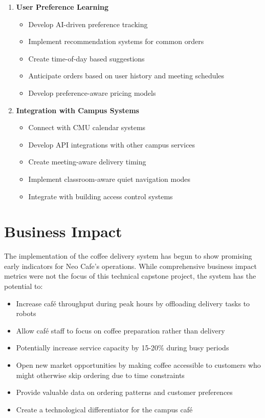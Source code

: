 \documentclass[12pt]{article}
\begin{document}
\begin{enumerate}
    \item \textbf{User Preference Learning}
    \begin{itemize}
        \item Develop AI-driven preference tracking
        \item Implement recommendation systems for common orders
        \item Create time-of-day based suggestions
        \item Anticipate orders based on user history and meeting schedules
        \item Develop preference-aware pricing models
    \end{itemize}
    
    \item \textbf{Integration with Campus Systems}
    \begin{itemize}
        \item Connect with CMU calendar systems
        \item Develop API integrations with other campus services
        \item Create meeting-aware delivery timing
        \item Implement classroom-aware quiet navigation modes
        \item Integrate with building access control systems
    \end{itemize}
\end{enumerate}

\section{Business Impact}

The implementation of the coffee delivery system has begun to show promising early indicators for Neo Cafe's operations. While comprehensive business impact metrics were not the focus of this technical capstone project, the system has the potential to:

\begin{itemize}
    \item Increase café throughput during peak hours by offloading delivery tasks to robots
    \item Allow café staff to focus on coffee preparation rather than delivery
    \item Potentially increase service capacity by 15-20\% during busy periods
    \item Open new market opportunities by making coffee accessible to customers who might otherwise skip ordering due to time constraints
    \item Provide valuable data on ordering patterns and customer preferences
    \item Create a technological differentiator for the campus café
\end{itemize}
\end{document}

